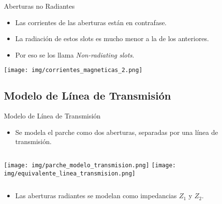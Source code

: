 \begin{frame}{Aberturas no Radiantes}

    \begin{itemize}
        \item<1-> Las corrientes de las aberturas están en contrafase.
        \item<3-> La radiación de estos slots es mucho menor a la de los anteriores.
        \item<4-> Por eso se los llama \textit{Non-radiating slots}.
    \end{itemize}

\begin{center}
    \texttt{[image: img/corrientes\_magneticas\_2.png]}
\end{center}
\end{frame}

\subsection{Modelo de Línea de Transmisión}
\begin{frame}{Modelo de Línea de Transmisión}
    \begin{itemize}
        \item<1-> Se modela el parche como dos aberturas, separadas por una línea de transmisión.
    \end{itemize}
    \begin{columns}
            \texttt{[image: img/parche\_modelo\_transmision.png]}
            \texttt{[image: img/equivalente\_linea\_transmision.png]}
    \end{columns}
    \begin{itemize}
        \item<3-> Las aberturas radiantes se modelan como impedancias $Z_1$ y $Z_2$.
    \end{itemize}
\end{frame}

